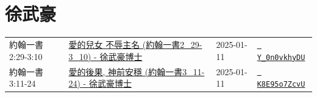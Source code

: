 \documentclass{book}
\begin{document}
\chapter{徐武豪}\label{ch:preacher1}
\begin{multicols}{3}
\minitoc
\end{multicols}
{ \scriptsize


\begin{xltabular}{\textwidth}{|p{0.15\textwidth} p{0.6\textwidth}|p{0.07\textwidth} p{0.1\textwidth}|}
\hline
約翰一書 2:29-3:10 & \hyperref[sec:Y_0n0vkhyDU]{愛的兒女 不辱主名 (約翰一書2\_29-3\_10) - 徐武豪博士} & 2025-01-11 & \href{https://youtube.com/watch?v=Y_0n0vkhyDU}{\texttt{ Y\_0n0vkhyDU}} \\
約翰一書 3:11-24 & \hyperref[sec:K8E95o7ZcvU]{愛的後果, 神前安穩 (約翰一書3\_11-24) - 徐武豪博士} & 2025-01-11 & \href{https://youtube.com/watch?v=K8E95o7ZcvU}{\texttt{ K8E95o7ZcvU}} \\
\hline
\end{xltabular}
}
\newpage
\end{document}
